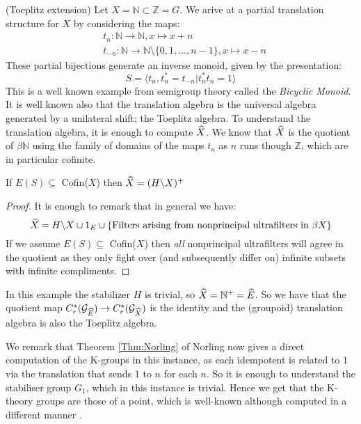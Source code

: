 \begin{example}\label{Ex:Toe}(Toeplitz extension)
Let $X=\mathbb{N} \subset \mathbb{Z}=G$. We arive at a partial translation structure for $X$ by considering the maps:
\begin{eqnarray*}
& t_{n}: \mathbb{N} \rightarrow \mathbb{N}, x \mapsto x+n \\
&t_{-n}: \mathbb{N} \rightarrow \mathbb{N}\setminus \lbrace 0,1,...,n-1 \rbrace , x \mapsto x-n
\end{eqnarray*} 
These partial bijections generate an inverse monoid, given by the presentation:
\begin{equation*}
S=\langle t_{n},t_{n}^{*}=t_{-n} | t_{n}^{*}t_{n}=1 \rangle
\end{equation*}
This is a well known example from semigroup theory called the \textit{Bicyclic Monoid}. It is well known also that the translation algebra is the universal algebra generated by a unilateral shift; the Toeplitz algebra. To understand the translation algebra, it is enough to compute $\widehat{X}$. We know that $\widehat{X}$ is the quotient of $\beta \mathbb{N}$ using the family of domains of the maps $t_{n}$ as $n$ runs though $\mathbb{Z}$, which are in particular cofinite.

\begin{claim}\label{prop:example}
If $E(S) \subseteq $ Cofin($X$) then $\widehat{X} = (H \backslash X)^{+}$   
\end{claim}
\begin{proof}
It is enough to remark that in general we have:
\begin{equation*}
\widehat{X} = H\backslash X \cup {1_{E}} \cup \lbrace \mbox{Filters arising from nonprincipal ultrafilters in } \beta X \rbrace
\end{equation*} If we assume $E(S) \subseteq $ Cofin($X$) then \textit{all} nonprincipal ultrafilters will agree in the quotient as they only fight over (and subsequently differ on) infinite subsets with infinite compliments.
\end{proof}

In this example the stabilizer $H$ is trivial, so $\widehat{X} = \mathbb{N}^{+} = \widehat{E}$. So we have that the quotient map $C^{*}_{r}(\mathcal{G}_{\widehat{E}}) \rightarrow C^{*}_{r}(\mathcal{G}_{\widehat{X}})$ is the identity and the (groupoid) translation algebra is also the Toeplitz algebra.

We remark that Theorem \ref{Thm:Norling} of Norling now gives a direct computation of the K-groups in this instance, as each idempotent is related to $1$ via the translation that sends $1$ to $n$ for each $n$. So it is enough to understand the stabiliser group $G_{1}$, which in this instance is trivial. Hence we get that the K-theory groups are those of a point, which is well-known although computed in a different manner \cite{MR587369,MR2457037}.
\end{example}

